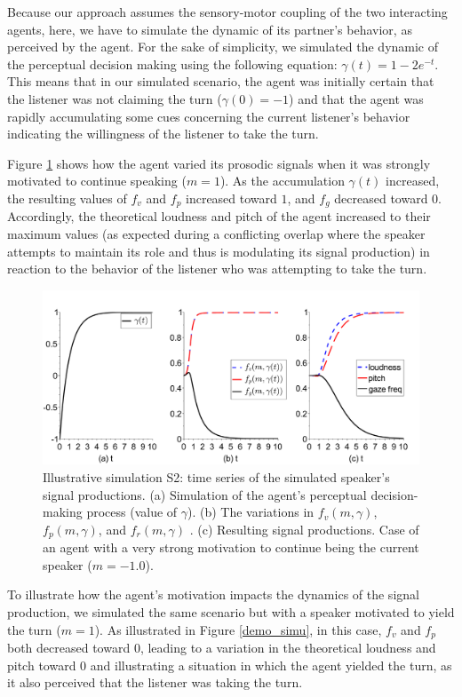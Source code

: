 \documentclass[twocolumn]{svjour3}
\begin{document}
Because our approach assumes the sensory-motor coupling of the two interacting agents, here, we have to simulate the dynamic of its partner's behavior, as perceived by the agent.
For the sake of simplicity, we simulated the dynamic of the perceptual decision making using the following equation: $\gamma(t)=1-2e^{-t}$. 
This means that in our simulated scenario, the agent was initially certain that the listener was not claiming the turn ($\gamma(0) = -1$) and that the agent was rapidly accumulating some cues concerning the current listener's behavior indicating the willingness of the listener to take the turn. 

Figure \ref{demo_simu_l1} shows how the agent varied its prosodic signals when it was strongly motivated to continue speaking ($m=1$).
As the accumulation $\gamma(t)$ increased, the resulting values of $f_v$ and $f_p$ increased toward $1$, and $f_g$ decreased toward $0$. 
Accordingly, the theoretical loudness and pitch of the agent increased to their maximum values (as expected during a conflicting overlap where the speaker attempts to maintain its role and thus is modulating its signal production) in reaction to the behavior of the listener who was attempting to take the turn. 

\begin{figure}
  \centering
  \includegraphics[width=\linewidth]{figure/signals_simu_s2a.pdf}
  \caption{Illustrative simulation S2: time series of the simulated speaker's signal productions. (a) Simulation of the agent's perceptual decision-making process (value of $\gamma$). (b) The variations in $f_v(m,\gamma)$, $f_p(m,\gamma)$, and $f_r(m,\gamma)$ . (c) Resulting  signal productions. Case of an agent with a very strong motivation to continue being the current speaker ($m=-1.0$).}
  \label{demo_simu_l1}
\end{figure}

To illustrate how the agent's motivation impacts the dynamics of the signal production, we simulated the same scenario but with a speaker motivated to yield the turn ($m=1$). As illustrated in Figure \ref{demo_simu}, in this case, $f_v$ and $f_p$ both decreased toward $0$, leading to a variation in the theoretical loudness and pitch toward $0$ and illustrating a situation in which the agent yielded the turn, as it also perceived that the listener was taking the turn. 
\end{document}
